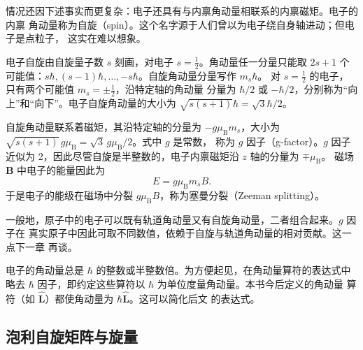 情况还因下述事实而更复杂：电子还具有与内禀角动量相联系的内禀磁矩。电子的内禀
角动量称为自旋（spin）。这个名字源于人们曾以为电子绕自身轴进动；但电子是点粒子，
这实在难以想象。

电子自旋由自旋量子数 $s$ 刻画，对电子 $s=\frac{1}{2}$。角动量任一分量只能取
$2s+1$ 个可能值：$s\hbar,(s-1)\hbar,\ldots,-s\hbar$。自旋角动量分量写作 $m_s\hbar$。
对 $s=\frac{1}{2}$ 的电子，只有两个可能值 $m_s=\pm\frac{1}{2}$，沿特定轴的角动量
分量为 $\hbar/2$ 或 $-\hbar/2$，分别称为“向上”和“向下”。电子自旋角动量的大小为
$\sqrt{s(s+1)}\hbar=\sqrt{3}\hbar/2$。

自旋角动量联系着磁矩，其沿特定轴的分量为 $-g\mu_{\mathrm{B}}m_s$，大小为
$\sqrt{s(s+1)}\,g\mu_{\mathrm{B}}=\sqrt{3}\,g\mu_{\mathrm{B}}/2$。式中 $g$ 是常数，
称为 $g$ 因子（g-factor）。$g$ 因子
近似为 2，因此尽管自旋是半整数的，电子内禀磁矩沿 $z$ 轴的分量为 $\mp\mu_{\mathrm{B}}$。
磁场 $\mathbf{B}$ 中电子的能量因此为
\begin{equation*}
E = g\mu_{\mathrm{B}}m_s B.\tag{1.35}
\end{equation*}
于是电子的能级在磁场中分裂 $g\mu_{\mathrm{B}}B$，称为塞曼分裂（Zeeman splitting）。

一般地，原子中的电子可以既有轨道角动量又有自旋角动量，二者组合起来。$g$ 因子在
真实原子中因此可取不同数值，依赖于自旋与轨道角动量的相对贡献。这一点下一章
再谈。

电子的角动量总是 $\hbar$ 的整数或半整数倍。为方便起见，在角动量算符的表达式中
略去 $\hbar$ 因子，即约定这些算符以 $\hbar$ 为单位度量角动量。本书今后定义的角动量
算符（如 $\hat{\mathbf{L}}$）都使角动量为 $\hbar\hat{\mathbf{L}}$。这可以简化后文
的表达式。

\subsection{泡利自旋矩阵与旋量}

